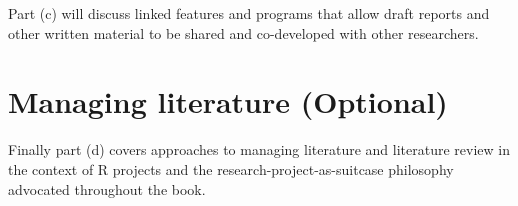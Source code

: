 \documentclass[]{book}
\theoremstyle{definition}
\theoremstyle{definition}
\theoremstyle{definition}
\theoremstyle{remark}
\begin{document}
Part (c) will discuss linked features and programs that allow draft
reports and other written material to be shared and co-developed with
other researchers.

\section{Managing literature
(Optional)}\label{managing-literature-optional}

Finally part (d) covers approaches to managing literature and literature
review in the context of R projects and the research-project-as-suitcase
philosophy advocated throughout the book.


\end{document}
